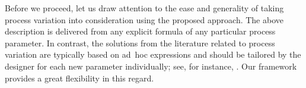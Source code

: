 Before we proceed, let us draw attention to the ease and generality of taking
process variation into consideration using the proposed approach. The above
description is delivered from any explicit formula of any particular process
parameter. In contrast, the solutions from the literature related to process
variation are typically based on ad~hoc expressions and should be tailored by
the designer for each new parameter individually; see, for instance,
\cite{ghanta2006, bhardwaj2008, huang2009a}. Our framework provides a great
flexibility in this regard.
